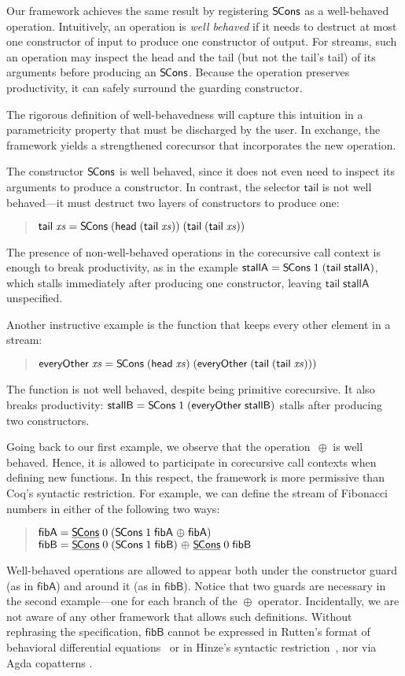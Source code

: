 \documentclass[preprint,draft]
{sigplanconf}
\newcommand\vvthinspace{\kern.041667ex}
\newcommand\vthinspace{\kern.08333ex}
\newcommand\TC{\mathsf}
\newcommand{\<}{\langle}
\renewcommand{\>}{\rangle}
\newcommand{\hd}{{{\mathsf{head}}}}
\newcommand{\tl}{{{\mathsf{tail}}}}
\newcommand{\SCons}{{{\mathsf{S\hspace*{-0.2ex}Cons}}}}
\newcommand{\opls}{\mathrel\oplus}
\newcommand{\everyOther}{{{\mathsf{everyOther}}}}
\newcommand{\fibA}{{{\mathsf{fibA}}}}
\newcommand{\fibB}{{{\mathsf{fibB}}}}
\newcommand{\GUARD}[1]{{{\underline{#1}}}}
\newcommand{\xs}{{\mathit{xs}}}
\newcommand\const[1]{{\ensuremath{\TC{#1}}}}
\begin{document}
Our framework achieves the same result by registering $\SCons$ as a
well-behaved operation. Intuitively, an operation is \emph{well behaved} if it
needs to destruct at most one constructor of input to produce one
constructor of output.
For streams, such an operation may inspect the head and the tail
(but not the tail's tail) of its arguments before producing an $\SCons$.
Because the operation preserves productivity, it can safely
surround the guarding constructor.

The rigorous definition of well-behavedness will capture
this intuition in a parametricity property that must be discharged
by the user. In exchange, the framework yields
a strengthened corecursor that incorporates the new operation.

The constructor $\SCons$ is well behaved, since it does not even need to
inspect its arguments to produce a constructor.
In contrast, the selector $\tl$ is not well behaved---it must destruct two
layers of constructors to produce one:
\begin{quote}
$\tl\;\xs = \SCons\;(\hd\;(\tl\;\xs))\;(\tl\;(\tl\;\xs))$
\end{quote}
The presence of non-well-behaved operations in the corecursive call context
is enough to break productivity, as
in the example $\const{stallA}  =  \SCons\;1\;(\tl\;\const{stallA})$, which stalls
immediately after producing one constructor, leaving $\tl\;\const{stallA}$ unspecified.

Another instructive example is the function that keeps every other element in a stream:
\begin{quote}
$\everyOther\;\xs  =  \SCons\;(\hd\;\xs)\;(\everyOther\;(\tl\;(\tl\;\xs)))$\kern200mm \end{quote}
The function is not well behaved, despite being primitive corecursive.
It also breaks productivity: $\const{stallB}  =  \SCons\;1\;(\everyOther\allowbreak\;\const{stallB})$
stalls after producing two constructors.

Going back to our first example, we observe that the operation~$\opls$ is well
behaved. Hence, it is allowed to participate in corecursive call contexts when
defining new functions. In this respect, the framework is more permissive than
Coq's syntactic restriction. For example, we can define the stream of Fibonacci
numbers in either of the following two ways:
\begin{quote}
$\fibA  =  \GUARD{\SCons}\;0\;(\SCons\;1\;\fibA \vvthinspace\opls\vvthinspace \fibA)$ \\[1\jot]
$\fibB  =  \GUARD{\SCons}\;0\;(\SCons\;1\;\fibB) \vthinspace\opls\vthinspace \GUARD{\SCons}\;0\;\fibB$
\end{quote}
Well-behaved operations are allowed to appear both under the constructor guard
(as in $\fibA$) and around it (as in $\fibB$). Notice that two guards are
necessary in the second example---one for each branch of the $\opls$ operator.
Incidentally, we are not aware of any other framework that allows such definitions. Without
rephrasing the specification, $\fibB$ cannot be expressed in Rutten's format of
behavioral differential equations~\cite{rutten05} or in Hinze's syntactic
restriction~\cite{hinze10}, nor via Agda copatterns \cite{abelPTS-2013,abelP-2013}.
\end{document}
